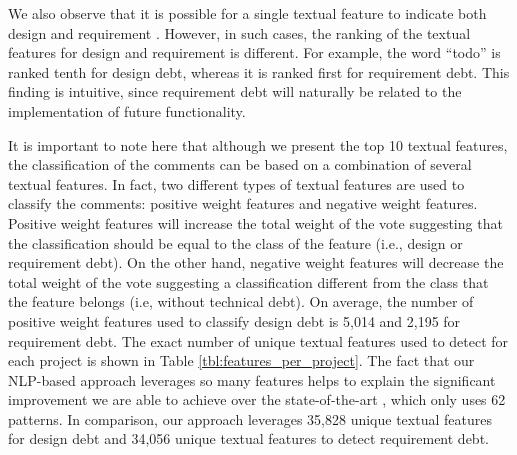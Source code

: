 We also observe that it is possible for a single textual feature to indicate both design and requirement \SATD. However, in such cases, the ranking of the textual features for design and requirement \SATD is different. For example, the word ``todo'' is ranked tenth for design debt, whereas it is ranked first for requirement debt. This finding is intuitive, since requirement debt will naturally be related to the implementation of future functionality.

It is important to note here that although we present the top 10 textual features, the classification of the comments can be based on a combination of several textual features. In fact, two different types of textual features are used to classify the comments: positive weight features and negative weight features. Positive weight features will increase the total weight of the vote suggesting that the classification should be equal to the class of the feature (i.e., design or requirement debt). On the other hand, negative weight features will decrease the total weight of the vote suggesting a classification different from the class that the feature belongs (i.e, without technical debt). On average, the number of positive weight features used to classify design debt is 5,014 and 2,195 for requirement debt. The exact number of unique textual features used to detect \SATD for each project is shown in Table \ref{tbl:features_per_project}. The fact that our NLP-based approach leverages so many features helps to explain the significant improvement we are able to achieve over the state-of-the-art , which only uses 62 patterns. In comparison, our approach leverages 35,828 unique textual features for design debt and 34,056 unique textual features to detect requirement debt.

